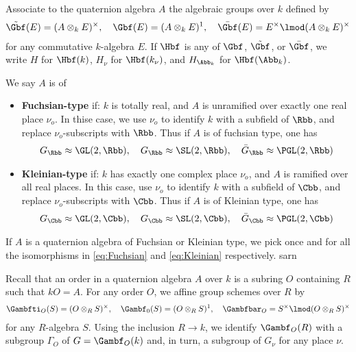 Associate to  the quaternion algebra $A$ the algebraic groups over $k$ defined by
\begin{align*}
    \tilde{\Gbf}(E) = (A\otimes_k E)^\times,\quad \Gbf (E) = (A\otimes_k E)^1,\quad  \bar{\Gbf}(E) = E^\times \lmod (A\otimes_k E)^\times
\end{align*}
for any commutative $k$-algebra $E$. If $\Hbf$ is any of $\Gbf$, $\tilde{\Gbf}$, or $\bar{\Gbf}$, we write $H$ for $\Hbf(k)$, $H_\nu$ for $\Hbf(k_\nu)$, and $H_{\Abb_k}$ for $\Hbf(\Abb_k)$.

\begin{definition}
    We say $A$ is of
    \begin{itemize}
        \item    \textbf{Fuchsian-type} if: $k$ is totally real, and $A$ is unramified over exactly one real place $\nu_o$. In thise case, we use $\nu_o$ to identify $k$ with a subfield of $\Rbb$, and replace $\nu_o$-subscripts with $\Rbb$. Thus if $A$ is of fuchsian type, one has
              \begin{align}\label{eq:Fuchsian}
                  G_\Rbb \approx \GL(2,\Rbb),\quad G_\Rbb \approx \SL(2,\Rbb),\quad  \bar{G}_\Rbb \approx \PGL(2,\Rbb)
              \end{align}
        \item \textbf{Kleinian-type} if: $k$ has exactly one complex place $\nu_o$, and $A$ is ramified over all real places. In this case, use $\nu_o$ to identify $k$ with a subfield of $\Cbb$, and replace $\nu_o$-subscripts with $\Cbb$. Thus if $A$ is of Kleinian type, one has
              \begin{align}\label{eq:Kleinian}
                  G_\Cbb \approx \GL(2,\Cbb),\quad G_\Cbb \approx\SL(2,\Cbb),\quad  \bar{G}_\Cbb \approx \PGL(2,\Cbb)
              \end{align}
    \end{itemize}
\end{definition}
If $A$ is a quaternion algebra of Fuchsian or Kleinian type, we pick once and for all the isomorphisms in \ref{eq:Fuchsian} and \ref{eq:Kleinian}  respectively. sarn



Recall that an order in a quaternion algebra $A$ over $k$ is a subring $O$ containing $R$ such that $kO = A$. For any order $O$, we affine group schemes over $R$ by
\begin{align*}
    \Gambfti_O(S) = (O\otimes_R S)^\times, \quad \Gambf_0(S) = (O\otimes_R S)^1, \quad \Gambfbar_O = S^\times \lmod (O\otimes_R S)^\times
\end{align*}
for any $R$-algebra $S$. Using the inclusion $R \to k$, we identify $\Gambf_O(R)$ with a subgroup $\Gamma_O$ of $G=\Gambf_O(k)$ and, in turn, a subgroup of $G_\nu$ for any place $\nu$.

